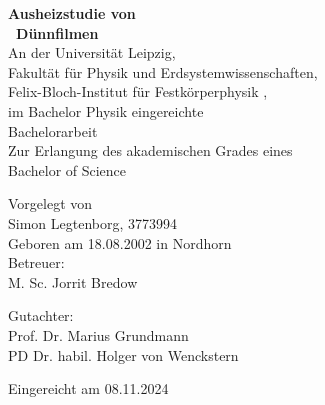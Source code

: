 \begin{titlepage}
    \begin{center}
        \vfill
        \Huge
        \textbf{Ausheizstudie von \\
        \heo\ Dünnfilmen} \\

        \vfill
        \Large
        An der Universität Leipzig, \\
        Fakultät für Physik und Erdsystemwissenschaften, \\
        Felix-Bloch-Institut für Festkörperphysik , \\
        im Bachelor Physik eingereichte \\

        \vfill
        \Huge
        Bachelorarbeit\\

        \vfill
        \Large
        Zur Erlangung des akademischen Grades eines \\
        Bachelor of Science

        \vfill
        Vorgelegt von \\
        Simon Legtenborg, 3773994 \\
        Geboren am 18.08.2002 in Nordhorn \\


        \vfill
        Betreuer: \\
        M. Sc. Jorrit Bredow

        \vfill
        Gutachter: \\
        Prof. Dr. Marius Grundmann \\
        PD Dr. habil. Holger von Wenckstern


        \vfill
        Eingereicht am 08.11.2024
        \vfill


    \end{center}
\end{titlepage}